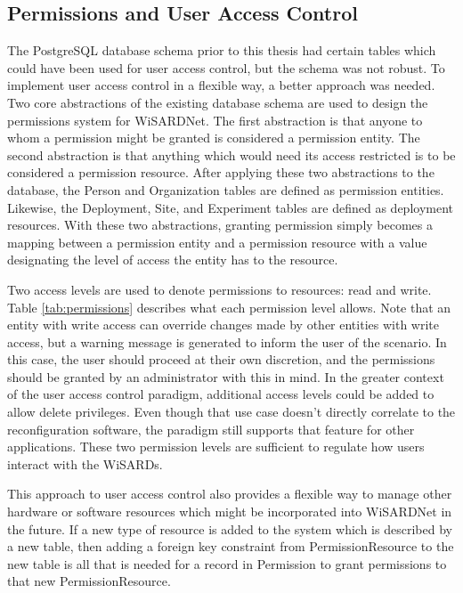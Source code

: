 \subsection{Permissions and User Access Control}
The PostgreSQL database schema prior to this thesis had certain tables which could have been used for user access control, but the schema was not robust. To implement user access control in a flexible way, a better approach was needed. Two core abstractions of the existing database schema are used to design the permissions system for WiSARDNet. The first abstraction is that anyone to whom a permission might be granted is considered a permission entity. The second abstraction is that anything which would need its access restricted is to be considered a permission resource. After applying these two abstractions to the database, the Person and Organization tables are defined as permission entities. Likewise, the Deployment, Site, and Experiment tables are defined as deployment resources. With these two abstractions, granting permission simply becomes a mapping between a permission entity and a permission resource with a value designating the level of access the entity has to the resource.

Two access levels are used to denote permissions to resources: read and write. Table \ref{tab:permissions} describes what each permission level allows. Note that an entity with write access can override changes made by other entities with write access, but a warning message is generated to inform the user of the scenario. In this case, the user should proceed at their own discretion, and the permissions should be granted by an administrator with this in mind. In the greater context of the user access control paradigm, additional access levels could be added to allow delete privileges. Even though that use case doesn't directly correlate to the reconfiguration software, the paradigm still supports that feature for other applications. These two permission levels are sufficient to regulate how users  interact with the WiSARDs. 

This approach to user access control also provides a flexible way to manage other hardware or software resources which might be incorporated into WiSARDNet in the future. If a new type of resource is added to the system which is described by a new table, then adding a foreign key constraint from PermissionResource to the new table is all that is needed for a record in Permission to grant permissions to that new PermissionResource.\\

